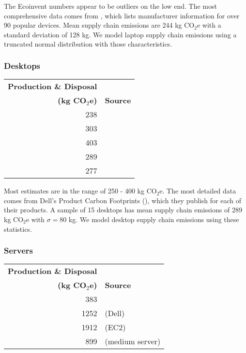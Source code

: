 \documentclass[11pt]{article}
\newcommand{\assumption}[1]{{#1}}
\begin{document}
The Ecoinvent numbers appear to be outliers on the low end.
The most comprehensive data comes from \textcite{rarecoil}, which lists manufacturer
information for over 90 popular devices. Mean supply chain emissions are
244 kg CO$_2$e with a standard deviation of 128 kg.
\assumption{We model laptop supply chain emissions using a truncated normal distribution with those characteristics.}

\subsubsection{Desktops}

\begin{center}
\begin{tabular}{|r|l|}
\hline
\textbf{Production \& Disposal} & \\
\textbf{(kg CO$_2$e)} & \textbf{Source} \\ \hline
238 & \textcite{ecoinvent} \\ \hline
303 & \textcite{teehan2013} \\ \hline
403 & \textcite{unctadder2024} \\ \hline
289 & \textcite{dellpcf} \\ \hline
277 & \textcite{boavizta} \\ \hline
\end{tabular}
\label{tab:embodied_emissions:desktops}
\end{center}

Most estimates are in the range of 250 - 400 kg CO$_2$e. The most detailed data comes from
Dell's Product Carbon Footprints (\textcite{dellpcf}), which they publish for each of their products.
A sample of 15 desktops has mean supply chain emissions of 289 kg CO$_2$e with $\sigma = 80$ kg.
\assumption{We model desktop supply chain emissions using these statistics.}

\subsubsection{Servers}

\begin{center}
\begin{tabular}{|r|l|}
\hline
\textbf{Production \& Disposal} & \\
\textbf{(kg CO$_2$e)} & \textbf{Source} \\ \hline
383 & \textcite{teehan2013} \\ \hline
1252 & \textcite{davy2021} (Dell) \\ \hline
1912 & \textcite{davy2021} (EC2) \\ \hline
899 & \textcite{boavizta} (medium server)\\ \hline
\end{tabular}
\label{tab:embodied_emissions:servers}
\end{center}
\end{document}
